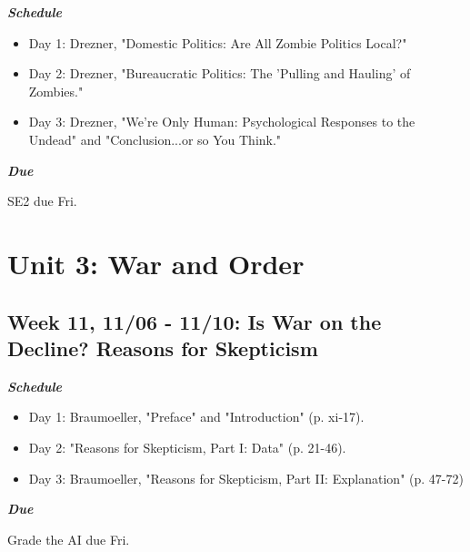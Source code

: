 \documentclass[11pt,]{article}
\begin{document}
\begin{multicols}{2}

\textbf{\textit{Schedule}}

\begin{itemize}

\item Day 1: Drezner, "Domestic Politics: Are All Zombie Politics Local?"

\item Day 2: Drezner, "Bureaucratic Politics: The 'Pulling and Hauling' of Zombies."

\item Day 3: Drezner, "We're Only Human: Psychological Responses to the Undead" and "Conclusion...or so You Think."

\end{itemize}

\columnbreak

\begin{flushright}

\textbf{\textit{Due}}

SE2 due Fri.

\end{flushright}

\end{multicols}

\hypertarget{unit-3-war-and-order}{%
\section{Unit 3: War and Order}\label{unit-3-war-and-order}}

\hypertarget{week-11-1106---1110-is-war-on-the-decline-reasons-for-skepticism}{%
\subsection{Week 11, 11/06 - 11/10: Is War on the Decline? Reasons for
Skepticism}\label{week-11-1106---1110-is-war-on-the-decline-reasons-for-skepticism}}

\begin{multicols}{2}

\textbf{\textit{Schedule}}

\begin{itemize}

\item Day 1: Braumoeller, "Preface" and "Introduction" (p. xi-17).

\item Day 2: "Reasons for Skepticism, Part I: Data" (p. 21-46).

\item Day 3: Braumoeller, "Reasons for Skepticism, Part II: Explanation" (p. 47-72)

\end{itemize}

\columnbreak

\begin{flushright}

\textbf{\textit{Due}}

Grade the AI due Fri.

\end{flushright}

\end{multicols}
\end{document}
